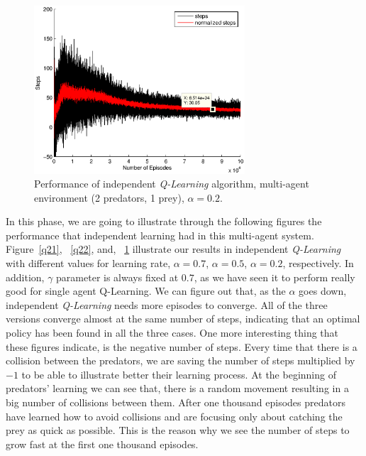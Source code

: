 \documentclass[a4paper,11pt]{article}
\begin{document}
\begin{figure}[ht!]
  \centering
	\includegraphics[width=0.7\textwidth]{figures/q202.eps}
    \caption{Performance of independent \textit{Q-Learning} algorithm, multi-agent environment (2 predators, 1 prey), $\alpha = 0.2$.}
    \label{q23}
\end{figure}

In this phase, we are going to illustrate through the following figures the performance that independent learning had in this multi-agent system. 
Figure~\ref{q21}, ~\ref{q22}, and, ~\ref{q23} illustrate our results in independent \textit{Q-Learning} with different values for learning rate, $\alpha = 0.7$, $\alpha = 0.5$, $\alpha = 0.2$, respectively. In addition, $\gamma$ parameter is always fixed at $0.7$, as we have seen it to perform really good for single agent {Q-Learning}. We can figure out that, as the $\alpha$ goes down, independent \textit{Q-Learning} needs more episodes to converge. All of the three versions converge almost at the same number of steps, indicating that an optimal policy has been found in all the three cases.   
One more interesting thing that these figures indicate, is the negative number of steps. Every time that there is a collision between the predators, we are saving the number of steps multiplied by $-1$ to be able to illustrate better their learning process. At the beginning of predators' learning we can see that, there is a random movement resulting in a big number of collisions between them. After one thousand episodes predators have learned how to avoid collisions and are focusing only about catching the prey as quick as possible. This is the reason why we see the number of steps to grow fast at the first one thousand episodes.
\end{document}
